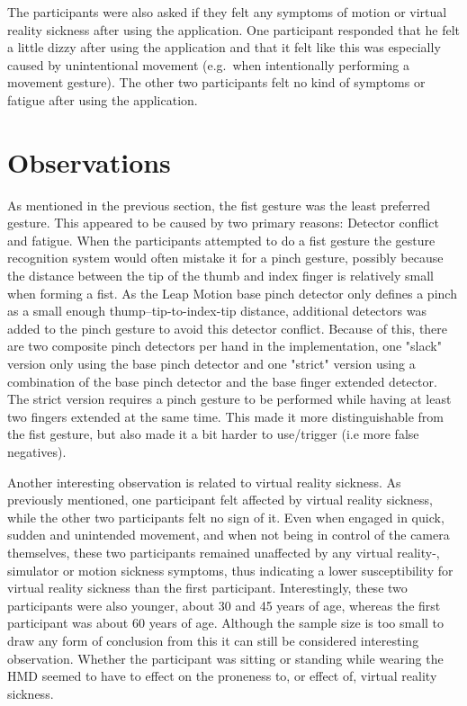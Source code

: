 The participants were also asked if they felt any symptoms of motion or virtual reality sickness after using the application. 
One participant responded that he felt a little dizzy after using the application and that it felt like this was especially caused by unintentional movement 
(e.g.~when intentionally performing a movement gesture). The other two participants felt no kind of symptoms or fatigue after using the application.

\section{Observations}
As mentioned in the previous section, the fist gesture was the least preferred gesture.
This appeared to be caused by two primary reasons: Detector conflict and fatigue.
When the participants attempted to do a fist gesture the gesture recognition system would often mistake it for a pinch gesture,
possibly because the distance between the tip of the thumb and index finger is relatively small when forming a fist. As the Leap Motion base pinch detector only defines a pinch
as a small enough thump--tip-to-index-tip distance, additional detectors was added to the pinch gesture to avoid this detector conflict. 
Because of this, there are two composite pinch
detectors per hand in the implementation, one "slack" version only using the base pinch detector and one "strict" version using a combination of the base
pinch detector and the base finger extended detector. The strict version requires a pinch gesture to be performed while having at least two fingers extended at the same time. 
This made it more distinguishable from the fist gesture, but also made it a bit harder to use/trigger (i.e more false negatives).

Another interesting observation is related to virtual reality sickness. As previously mentioned, one participant felt affected by virtual reality sickness, while 
the other two participants felt no sign of it. Even when engaged in quick, sudden and unintended movement, and when not being in control of the camera themselves, these 
two participants remained unaffected by any virtual reality-, simulator or motion sickness symptoms, thus indicating a lower susceptibility for virtual reality sickness 
than the first participant. Interestingly, these two participants were also younger, about 30 and 45 years of age, whereas the first participant was 
about 60 years of age. Although the sample size is too small to draw any form of conclusion from this it can still be considered interesting observation.
Whether the participant was sitting or standing while wearing the HMD seemed to have to effect on the proneness to, or effect of, virtual reality sickness.



